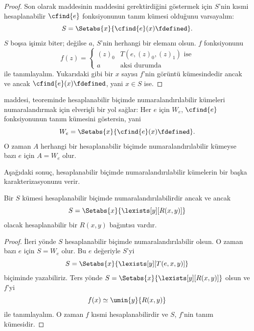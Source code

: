\begin{proof}
Son olarak  maddesinin  maddesini
gerektirdiğini göstermek için $S$'nin kısmi hesaplanabilir
$\cfind{e}$ fonksiyonunun tanım kümesi olduğunu varsayalım:
\[
  S=\Setabs{x}{\cfind{e}(x)\fdefined}.
\]
$S$ boşsa işimiz biter; değilse $a$, $S$'nin herhangi bir elemanı olsun.
$f$ fonksiyonunu
\[
  f(z)=\begin{cases}
    (z)_0 & \text{$T(e,(z)_0,(z)_1)$ ise}\\
    a & \text{aksi durumda}
  \end{cases}
\]
ile tanımlayalım. Yukarıdaki gibi bir $x$ sayısı $f$'nin görüntü kümesindedir
ancak ve ancak $\cfind{e}(x)\fdefined$, yani $x\in S$ ise.
\end{proof}

 maddesi,  teoreminde
hesaplanabilir biçimde numaralandırılabilir kümeleri numaralandırmak için
elverişli bir yol sağlar: Her $e$ için $W_e$, $\cfind{e}$ fonksiyonunun tanım
kümesini göstersin, yani
\[
  W_e=\Setabs{x}{\cfind{e}(x)\fdefined}.
\]
O zaman $A$ herhangi bir hesaplanabilir biçimde numaralandırılabilir kümeyse
bazı $e$ için $A=W_e$ olur.

Aşağıdaki sonuç, hesaplanabilir biçimde numaralandırılabilir kümelerin bir
başka karakterizasyonunu verir.

\begin{thm}
Bir $S$ kümesi hesaplanabilir biçimde numaralandırılabilirdir ancak ve ancak
\[
  S=\Setabs{x}{\lexists[y][R(x,y)]}
\]
olacak hesaplanabilir bir $R(x,y)$ bağıntısı vardır.
\end{thm}

\begin{proof}
İleri yönde $S$ hesaplanabilir biçimde numaralandırılabilir olsun. O zaman
bazı $e$ için $S=W_e$ olur. Bu $e$ değeriyle $S$'yi
\[
  S=\Setabs{x}{\lexists[y][T(e,x,y)]}
\]
biçiminde yazabiliriz. Ters yönde
$S=\Setabs{x}{\lexists[y][R(x,y)]}$ olsun ve $f$'yi
\[
  f(x)\simeq\umin{y}{R(x,y)}
\]
ile tanımlayalım. O zaman $f$ kısmi hesaplanabilirdir ve $S$, $f$'nin tanım
kümesidir.
\end{proof}

